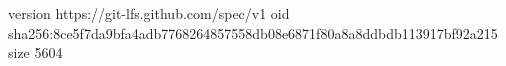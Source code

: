 version https://git-lfs.github.com/spec/v1
oid sha256:8ce5f7da9bfa4adb7768264857558db08e6871f80a8a8ddbdb113917bf92a215
size 5604
